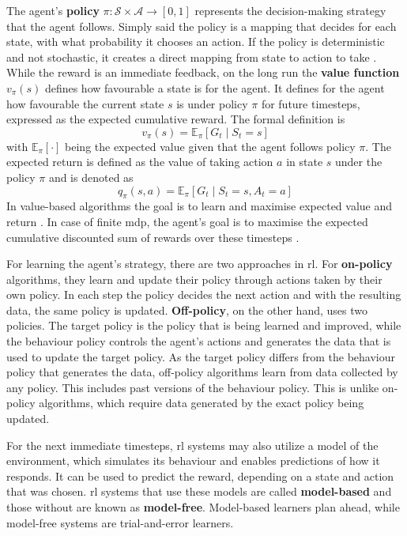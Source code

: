 The agent's \textbf{policy} $\pi:\mathcal{S} \times \mathcal{A} \rightarrow [0,1]$ represents the decision-making strategy that the agent follows. Simply said the policy is a mapping that decides for each state, with what probability it chooses an action. If the policy is deterministic and not stochastic, it creates a direct mapping from state to action to take \cite{openaiRLIntro}. While the reward is an immediate feedback, on the long run the \textbf{value function} $v_{\pi}(s)$ defines how favourable a state is for the agent. It defines for the agent how favourable the current state $s$ is under policy $\pi$ for future timesteps, expressed as the expected cumulative reward. The formal definition is
\[v_{\pi}(s) = \mathbb{E}_{\pi}\!\left[ G_t \mid S_t = s \right]\]
with $\mathbb{E}_{\pi}\!\left[ \cdot \right]$ being the expected value given that the agent follows policy $\pi$. 
The expected return is defined as the value of taking action $a$ in state $s$ under the policy $\pi$ and is denoted as 
\[q_{\pi}(s,a) = \mathbb{E}_{\pi}\!\left[ G_t \mid S_t = s, A_t = a \right]\]
In value-based algorithms the goal is to learn and maximise expected value and return \cite{rl2grid}. In case of finite \ac{mdp}, the agent's goal is to maximise the expected cumulative discounted sum of rewards over these timesteps \cite{grl4powergrids}.

For learning the agent's strategy, there are two approaches in \ac{rl}. For \textbf{on-policy} algorithms, they learn and update their policy through actions taken by their own policy. In each step the policy decides the next action and with the resulting data, the same policy is updated. 
\textbf{Off-policy}, on the other hand, uses two policies. The target policy is the policy that is being learned and improved, while the behaviour policy controls the agent's actions and generates the data that is used to update the target policy. As the target policy differs from the behaviour policy that generates the data, off-policy algorithms learn from data collected by any policy. This includes past versions of the behaviour policy. This is unlike on-policy algorithms, which require data generated by the exact policy being updated.

For the next immediate timesteps, \ac{rl} systems may also utilize a model of the environment, which simulates its behaviour and enables predictions of how it responds. It can be used to predict the reward, depending on a state and action that was chosen. \ac{rl} systems that use these models are called \textbf{model-based} and those without are known as \textbf{model-free}. Model-based learners plan ahead, while model-free systems are trial-and-error learners. 

